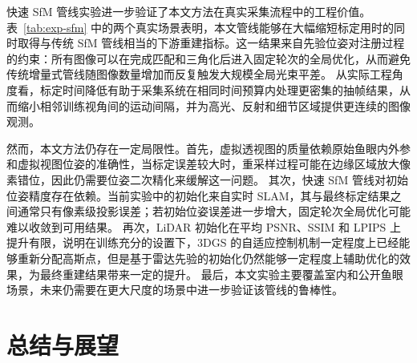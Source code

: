 快速 SfM 管线实验进一步验证了本文方法在真实采集流程中的工程价值。表~\ref{tab:exp-sfm} 中的两个真实场景表明，本文管线能够在大幅缩短标定用时的同时取得与传统 SfM 管线相当的下游重建指标。这一结果来自先验位姿对注册过程的约束：所有图像可以在完成匹配和三角化后进入固定轮次的全局优化，从而避免传统增量式管线随图像数量增加而反复触发大规模全局光束平差。
从实际工程角度看，标定时间降低有助于采集系统在相同时间预算内处理更密集的抽帧结果，从而缩小相邻训练视角间的运动间隔，并为高光、反射和细节区域提供更连续的图像观测。

然而，本文方法仍存在一定局限性。首先，虚拟透视图的质量依赖原始鱼眼内外参和虚拟视图位姿的准确性，当标定误差较大时，重采样过程可能在边缘区域放大像素错位，因此仍需要位姿二次精化来缓解这一问题。
其次，快速 SfM 管线对初始位姿精度存在依赖。当前实验中的初始化来自实时 SLAM，其与最终标定结果之间通常只有像素级投影误差；若初始位姿误差进一步增大，固定轮次全局优化可能难以收敛到可用结果。
再次，LiDAR 初始化在平均 PSNR、SSIM 和 LPIPS 上提升有限，说明在训练充分的设置下，3DGS 的自适应控制机制一定程度上已经能够重新分配高斯点，但是基于雷达先验的初始化仍然能够一定程度上辅助优化的效果，为最终重建结果带来一定的提升。
最后，本文实验主要覆盖室内和公开鱼眼场景，未来仍需要在更大尺度的场景中进一步验证该管线的鲁棒性。

\section{总结与展望}

